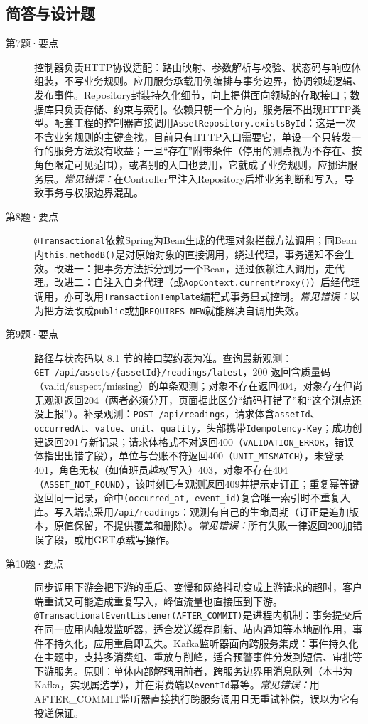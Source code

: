 \subsection*{简答与设计题}
\begin{description}
  \item[第7题·要点] 控制器负责HTTP协议适配：路由映射、参数解析与校验、状态码与响应体组装，不写业务规则。应用服务承载用例编排与事务边界，协调领域逻辑、发布事件。Repository封装持久化细节，向上提供面向领域的存取接口；数据库只负责存储、约束与索引。依赖只朝一个方向，服务层不出现HTTP类型。配套工程的控制器直接调用\texttt{AssetRepository.existsById}：这是一次不含业务规则的主键查找，目前只有HTTP入口需要它，单设一个只转发一行的服务方法没有收益；一旦“存在”附带条件（停用的测点视为不存在、按角色限定可见范围），或者别的入口也要用，它就成了业务规则，应挪进服务层。\textit{常见错误：}在Controller里注入Repository后堆业务判断和写入，导致事务与权限边界混乱。
  \item[第8题·要点] \texttt{@Transactional}依赖Spring为Bean生成的代理对象拦截方法调用；同Bean内\texttt{this.methodB()}是对原始对象的直接调用，绕过代理，事务通知不会生效。改进一：把事务方法拆分到另一个Bean，通过依赖注入调用，走代理。改进二：自注入自身代理（或\texttt{AopContext.currentProxy()}）后经代理调用，亦可改用\texttt{TransactionTemplate}编程式事务显式控制。\textit{常见错误：}以为把方法改成\texttt{public}或加\texttt{REQUIRES\_NEW}就能解决自调用失效。
  \item[第9题·要点] 路径与状态码以 8.1 节的接口契约表为准。查询最新观测：\texttt{GET\allowbreak\ /api/assets/\allowbreak\{assetId\}/\allowbreak readings/latest}，200 返回含质量码（valid/suspect/missing）的单条观测；对象不存在返回404，对象存在但尚无观测返回204（两者必须分开，页面据此区分“编码打错了”和“这个测点还没上报”）。补录观测：\texttt{POST /api/readings}，请求体含\texttt{assetId}、\texttt{occurredAt}、\texttt{value}、\texttt{unit}、\texttt{quality}，头部携带\texttt{Idempotency-Key}；成功创建返回201与新记录；请求体格式不对返回400（\texttt{VALIDATION\_ERROR}，错误体指出出错字段），单位与台账不符返回400（\texttt{UNIT\_MISMATCH}），未登录401，角色无权（如值班员越权写入）403，对象不存在404（\texttt{ASSET\_NOT\_FOUND}），该时刻已有观测返回409并提示走订正；重复幂等键返回同一记录，命中\texttt{(occurred\_at, event\_id)}复合唯一索引时不重复入库。写入端点采用\texttt{/api/readings}：观测有自己的生命周期（订正是追加版本，原值保留，不提供覆盖和删除）。\textit{常见错误：}所有失败一律返回200加错误字段，或用GET承载写操作。
  \item[第10题·要点] 同步调用下游会把下游的重启、变慢和网络抖动变成上游请求的超时，客户端重试又可能造成重复写入，峰值流量也直接压到下游。\texttt{@TransactionalEventListener}\allowbreak\texttt{(AFTER\_COMMIT)}是进程内机制：事务提交后在同一应用内触发监听器，适合发送缓存刷新、站内通知等本地副作用，事件不持久化，应用重启即丢失。Kafka监听器面向跨服务集成：事件持久化在主题中，支持多消费组、重放与削峰，适合预警事件分发到短信、审批等下游服务。原则：单体内部解耦用前者，跨服务边界用消息队列（本书为Kafka，实现属选学），并在消费端以\texttt{eventId}幂等。\textit{常见错误：}用AFTER\_COMMIT监听器直接执行跨服务调用且无重试补偿，误以为它有投递保证。

\end{description}
